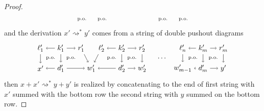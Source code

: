 \documentclass{amsart}
\newcommand{\deriv}[2]{#1 \rightsquigarrow^\ast #2}
\theoremstyle{remark}
\theoremstyle{definition}
\begin{document}
\begin{proof}
\[\begin{tikzpicture}
      \node () at (3.5,0.5) {\scriptsize{p.o.}};
      \node () at (4.5,0.5) {\scriptsize{p.o.}};
      \node () at (7.5,0.5) {\scriptsize{p.o.}};
      \node () at (8.5,0.5) {\scriptsize{p.o.}};
    \end{tikzpicture}
  \]
  and the derivation $ \deriv{x'}{y'} $ comes from a string of double
  pushout diagrams
  \[
    \begin{tikzpicture}
      \node (1t) at (0,1) {$ \ell'_1 $};
      \node (2t) at (1,1) {$ k'_1 $};
      \node (3t) at (2,1) {$ r'_1 $};
      \node (4t) at (3,1) {$ \ell'_2 $};
      \node (5t) at (4,1) {$ k'_2 $};
      \node (6t) at (5,1) {$ r'_2 $};
      \node (7t) at (7,1) {$ \ell'_n $};
      \node (8t) at (8,1) {$ k'_m $};
      \node (9t) at (9,1) {$ r'_m $};
      \node (1b) at (0,0) {$ x' $};
      \node (2b) at (1,0) {$ d'_1 $};
      \node (3b) at (2.5,0) {$ w'_1 $};
      \node (4b) at (4,0) {$ d'_2 $};
      \node (5b) at (5,0) {$ w'_2 $};
      \node (6b) at (7,0) {$ w'_{m-1} $};
      \node (7b) at (8,0) {$ d'_m $};
      \node (8b) at (9,0) {$ y' $};
      \draw [->] (2t) to node [] {\scriptsize{$  $}} (1t);
      \draw [->] (2t) to node [] {\scriptsize{$  $}} (3t);
      \draw [->] (5t) to node [] {\scriptsize{$  $}} (4t);
      \draw [->] (5t) to node [] {\scriptsize{$  $}} (6t);
      \draw [->] (8t) to node [] {\scriptsize{$  $}} (7t);
      \draw [->] (8t) to node [] {\scriptsize{$  $}} (9t);
      \draw [->] (2b) to node [] {\scriptsize{$  $}} (1b);
      \draw [->] (2b) to node [] {\scriptsize{$  $}} (3b);
      \draw [->] (4b) to node [] {\scriptsize{$  $}} (3b);
      \draw [->] (4b) to node [] {\scriptsize{$  $}} (5b);
      \draw [->] (7b) to node [] {\scriptsize{$  $}} (6b);
      \draw [->] (7b) to node [] {\scriptsize{$  $}} (8b);
      \draw [->] (1t) to node [] {\scriptsize{$  $}} (1b);
      \draw [->] (2t) to node [] {\scriptsize{$  $}} (2b);
      \draw [->] (3t) to node [] {\scriptsize{$  $}} (3b);
      \draw [->] (4t) to node [] {\scriptsize{$  $}} (3b);
      \draw [->] (5t) to node [] {\scriptsize{$  $}} (4b);
      \draw [->] (6t) to node [] {\scriptsize{$  $}} (5b);
      \draw [->] (7t) to node [] {\scriptsize{$  $}} (6b);
      \draw [->] (8t) to node [] {\scriptsize{$  $}} (7b);
      \draw [->] (9t) to node [] {\scriptsize{$  $}} (8b);
      \node () at (6,0.5) {$ \dotsm $};
      \node () at (0.5,0.5) {\scriptsize{p.o.}};
      \node () at (1.5,0.5) {\scriptsize{p.o.}};
      \node () at (3.5,0.5) {\scriptsize{p.o.}};
      \node () at (4.5,0.5) {\scriptsize{p.o.}};
      \node () at (7.5,0.5) {\scriptsize{p.o.}};
      \node () at (8.5,0.5) {\scriptsize{p.o.}};
    \end{tikzpicture}
  \]
  then $ \deriv{x+x'}{y+y'} $ is realized by concatenating to the end
  of first string with $ x' $ summed with the bottom row the second
  string with $ y $ summed on the bottom row.
\end{proof}
\end{document}
